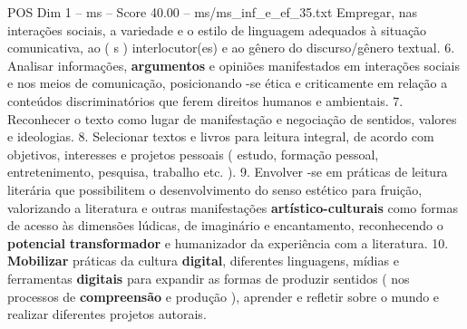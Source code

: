 \begin{textsample}{POS Dim 1 – ms – Score 40.00 – ms/ms\_inf\_e\_ef\_35.txt}
Empregar, nas interações sociais, a variedade e o estilo de linguagem adequados à situação comunicativa, ao ( s ) interlocutor(es) e ao gênero do discurso/gênero textual. 6.
Analisar informações, \textbf{argumentos} e opiniões manifestados em interações sociais e nos meios de comunicação, posicionando -se ética e criticamente em relação a conteúdos discriminatórios que ferem direitos humanos e ambientais. 7.
Reconhecer o texto como lugar de manifestação e negociação de sentidos, valores e ideologias. 8.
Selecionar textos e livros para leitura integral, de acordo com objetivos, interesses e projetos pessoais ( estudo, formação pessoal, entretenimento, pesquisa, trabalho etc. ). 9.
Envolver -se em práticas de leitura literária que possibilitem o desenvolvimento do senso estético para fruição, valorizando a literatura e outras manifestações \textbf{artístico-culturais} como formas de acesso às dimensões lúdicas, de imaginário e encantamento, reconhecendo o \textbf{potencial} \textbf{transformador} e humanizador da experiência com a literatura. 10. \textbf{Mobilizar} práticas da cultura \textbf{digital}, diferentes linguagens, mídias e ferramentas \textbf{digitais} para expandir as formas de produzir sentidos ( nos processos de \textbf{compreensão} e produção ), aprender e refletir sobre o mundo e realizar diferentes projetos autorais.

\end{textsample}
